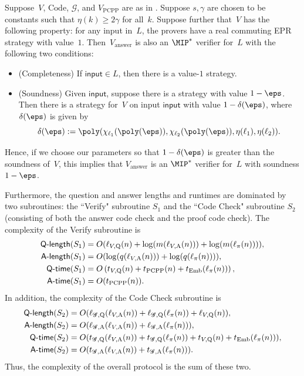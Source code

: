 \documentclass[11pt]{article}
\newcommand{\codec}{\mathrm{Code}}
\newcommand{\game}{\mathscr{G}}
\newcommand{\qtime}[1]{\mathsf{Q}\textnormal{-}\mathsf{time}(#1)}
\newcommand{\atime}[1]{\mathsf{A}\textnormal{-}\mathsf{time}(#1)}
\newcommand{\qlength}[1]{\mathsf{Q}\textnormal{-}\mathsf{length}(#1)}
\newcommand{\alength}[1]{\mathsf{A}\textnormal{-}\mathsf{length}(#1)}
\begin{document}
\begin{theorem}\label{thm:answer-reduction}
Suppose~$V$, $\codec$, $\game$, and $V_{\mathrm{PCPP}}$ are as in .
Suppose $s, \gamma$ are chosen to be constants such that $\eta(k) \geq 2\gamma$ for all~$k$.
Suppose further that~$V$ has the following property: for any input in~$L$,
the provers have a real commuting EPR strategy with value~$1$.
Then~$V_{\mathrm{answer}}$ is also an $\MIP^*$ verifier for~$L$ with the following two conditions:
\begin{itemize}
\item[$\circ$] (Completeness) If $\mathsf{input} \in L$, then there is a value-$1$ strategy.
\item[$\circ$] (Soundness) Given $\mathsf{input}$, suppose there is a strategy with value $1-\eps$.
			Then there is a strategy for~$V$ on input $\mathsf{input}$ with value $1-\delta(\eps)$, where $\delta(\eps)$ is given by
\begin{equation*}
\delta(\eps) := \poly(\chi_{\ell_1}(\poly(\eps)), \chi_{\ell_2}(\poly(\eps)), \eta(\ell_1), \eta(\ell_2)).
\end{equation*}
\end{itemize}
Hence, if we choose our parameters so that $1-\delta(\eps)$ is greater than the soundness of~$V$,
this implies that $V_{\mathrm{answer}}$ is an $\MIP^*$ verifier for~$L$ with soundness $1-\eps$.

Furthermore, the question and answer lengths and runtimes are dominated by two subroutines: the ``Verify" subroutine $S_1$ 
and the ``Code Check" subroutine $S_2$ (consisting of both the answer code check and the proof code check).
The complexity of the Verify subroutine is
\begin{align*}
\qlength{S_1} &= O(\ell_{V, \mathrm{Q}}(n) + \log(m(\ell_{V,\mathrm{A}}(n)))+ \log(m(\ell_{\pi}(n)))),\\
\alength{S_1} &= O(\log(q(\ell_{V,\mathrm{A}}(n))) + \log(q(\ell_\pi(n)))),\\
\qtime{S_1} &= O\left(t_{V,\mathrm{Q}}(n) + t_{\mathrm{PCPP}}(n) + t_{\mathrm{Emb}}(\ell_{\pi}(n))\right),\\
\atime{S_1} &= O(t_{\mathrm{PCPP}}(n)).
\end{align*}
In addition, the complexity of the Code Check subroutine is
\begin{align*}
\qlength{S_2} &= O(\ell_{\game, \mathrm{Q}}(\ell_{V, \mathrm{A}}(n)) + \ell_{\game, \mathrm{Q}}(\ell_\pi(n)) + \ell_{V, \mathrm{Q}}(n)),\\
\alength{S_2} &= O(\ell_{\game, \mathrm{A}}(\ell_{V, \mathrm{A}}(n)) + \ell_{\game, \mathrm{A}}(\ell_\pi(n))),\\
\qtime{S_2} &=  O(t_{\game, \mathrm{Q}}(\ell_{V, \mathrm{A}}(n)) + t_{\game, \mathrm{Q}}(\ell_\pi(n)) + t_{V, \mathrm{Q}}(n) + t_{\mathrm{Emb}}(\ell_{\pi}(n))),\\
\atime{S_2} &= O(t_{\game, \mathrm{A}}(\ell_{V, \mathrm{A}}(n)) + t_{\game, \mathrm{A}}(\ell_\pi(n))).
\end{align*}
Thus, the complexity of the overall protocol is the sum of these two.
\end{theorem}
\end{document}
